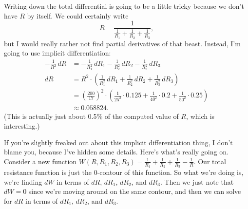 \begin{enumerate}[leftmargin=0pt]
\begin{red}
        Writing down the total differential is going to be a little tricky because we don't have $R$ by itself. We could certainly write
        \[R = \frac{1}{\frac1{R_1} + \frac1{R_2} + \frac1{R_3}},\]
        but I would really rather not find partial derivatives of that beast. Instead, I'm going to use implicit differentiation:
        \begin{align*}
            -\frac{1}{R^2}\,dR &= -\frac{1}{R_1^2}\,dR_1 - \frac{1}{R_2^2}\,dR_2 - \frac{1}{R_3^2}\,dR_3 \\
            dR &= R^2\cdot \left( \frac{1}{R_1^2}\,dR_1 + \frac{1}{R_2^2}\,dR_2 + \frac{1}{R_3^2}\,dR_3 \right) \\
            &= \left(\frac{200}{17}\right)^2\cdot\left(
            \frac{1}{25^2}\cdot0.125 + \frac{1}{40^2}\cdot0.2+ \frac{1}{50^2}\cdot0.25
            \right) \\
            &\approx 0.058824.
        \end{align*}
        (This is actually just about 0.5\% of the computed value of $R$, which is interesting.)
        
        If you're slightly freaked out about this implicit differentiation thing, I don't blame you, because I've hidden some details. Here's what's really going on. Consider a new function $W(R, R_1, R_2, R_3) = \frac1{R_1} + \frac1{R_2} + \frac1{R_3} - \frac1R$. Our total resistance function is just the $0$-contour of this function. So what we're doing is, we're finding $dW$ in terms of $dR$, $dR_1$, $dR_2$, and $dR_3$. Then we just note that $dW = 0$ since we're moving around on the same contour, and then we can solve for $dR$ in terms of $dR_1$, $dR_2$, and $dR_3$.
        \end{red}
        
\end{enumerate}

